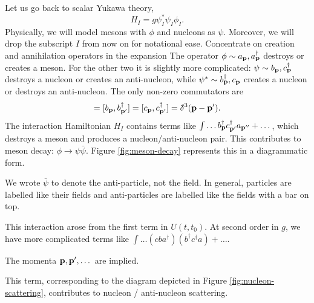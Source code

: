 \begin{example}[]
  Let us go back to scalar Yukawa theory, 
  \begin{equation}
    H_I = g \psi^*_I \psi_I \phi_I.
  \end{equation}
  Physically, we will model mesons with $\phi$ and nucleons as $\psi$.
  Moreover, we will drop the subscript $I$ from now on for notational ease.
  Concentrate on creation and annihilation operators in the expansion
  The operator $\phi \sim a_{\vb{p}}, a^{\dagger}_{\vb{p}}$ destroys or creates a meson.
  For the other two it is slightly more complicated:
  $\psi \sim b_{\vb{p}}, c ^{\dagger}_{\vb{p}}$ destroys a nucleon or creates an anti-nucleon, while 
  $\psi^* \sim b_{\vb{p}}^{\dagger}, c_{\vb{p}}$ creates a nucleon or destroys an anti-nucleon.
  The only non-zero commutators are
  \begin{equation}
    [a_{\vb{p}}, a_{\vb{p}'}^{\dagger}] = [b_{\vb{p}}, b_{\vb{p}'}^{\dagger}] = [c_{\vb{p}}, c_{\vb{p}'}^{\dagger}] = \bdelta^3(\vb{p} - \vb{p}').
  \end{equation}
  The interaction Hamiltonian $H_I$ contains terms like $\int \dots b_{\vb{p}}^{\dagger} c_{\vb{p}'}^{\dagger} a_{\vb{p}''} + \dots$, which destroys a meson and produces a nucleon/anti-nucleon pair. This contributes to meson decay: $\phi \to \psi \bar \psi$.
  Figure \ref{fig:meson-decay} represents this in a diagrammatic form.
  \begin{leftbar}
    \begin{remark}
      We wrote $\bar \psi$ to denote the anti-particle, not the field. In general, particles are labelled like their fields and anti-particles are labelled like the fields with a bar on top.
    \end{remark}
  \end{leftbar}
  This interaction arose from the first term in $U(t, t_0)$.
  At second order in $g$, we have more complicated terms like $\int \dots (c b a^{\dagger}) (b^{\dagger} c ^{\dagger} a) + \dots$. 
  \begin{leftbar}
    \begin{remark}
      The momenta $\vb{p}, \vb{p}', \dots$ are implied.
    \end{remark}
  \end{leftbar}
  This term, corresponding to the diagram depicted in Figure \ref{fig:nucleon-scattering}, contributes to nucleon / anti-nucleon scattering.

\end{example}
